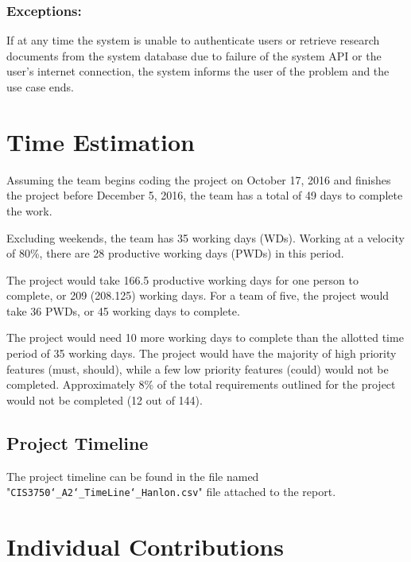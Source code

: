 \documentclass[12pt,letterpaper]{article}
\begin{document}
\subsubsection*{Exceptions:}
If at any time the system is unable to authenticate users or retrieve research documents from the system database due to failure of the system API or the user’s internet connection, the system informs the user of the problem and the use case ends.

\clearpage
\section{Time Estimation}
Assuming the team begins coding the project on October 17, 2016 and finishes the project before December 5, 2016, the team has a total of 49 days to complete the work. \par
Excluding weekends, the team has 35 working days (WDs). Working at a velocity of 80\%, there are 28 productive working days (PWDs) in this period. \par
The project would take 166.5 productive working days for one person to complete, or 209 (208.125) working days. For a team of five, the project would take 36 PWDs, or 45 working days to complete. \par
The project would need 10 more working days to complete than the allotted time period of 35 working days. The project would have the majority of high priority features (must, should), while a few low priority features (could) would not be completed. Approximately 8\% of the total requirements outlined for the project would not be completed (12 out of 144).

\subsection{Project Timeline}
The project timeline can be found in the file named "\texttt{CIS3750\char`_A2\char`_TimeLine\char`_Hanlon.csv}" file attached to the report.

\clearpage
\section{Individual Contributions}
\end{document}
